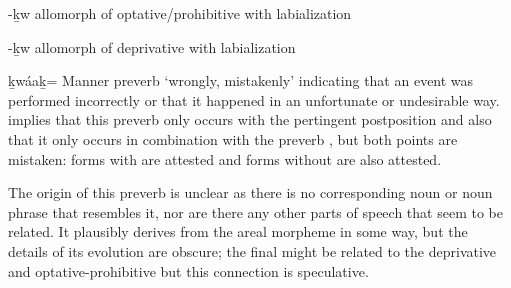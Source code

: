 \begin{morphdesc}[resume*=alphalist]
\item[-ḵw]\label{m:-ḵw-optphib}
	allomorph of optative/prohibitive  with labialization

\item[-ḵw]\label{m:-ḵw-dprv}
	allomorph of deprivative  with labialization

\item[ḵwáaḵ=]\label{m:ḵwáaḵ=}
	Manner preverb ‘wrongly, mistakenly’ indicating that an event was performed incorrectly
		or that it happened in an unfortunate or undesirable way.
	\textcite[134, 297]{leer:1991} implies that this preverb
		only occurs with the pertingent postposition 
		and also that it only occurs in combination with the preverb ,
		but both points are mistaken: forms with  are attested
		and forms without  are also attested.
	
	The origin of this preverb is unclear as there is no corresponding noun or noun phrase
		that resembles it, nor are there any other parts of speech that seem to be related.
	It plausibly derives from the areal morpheme  in some way, but
		the details of its evolution are obscure; the final  might be related to
		the deprivative  and optative-prohibitive 
		but this connection is speculative.
	

\end{morphdesc}

